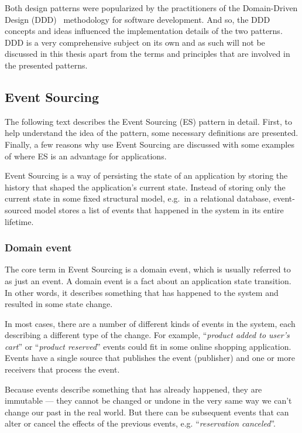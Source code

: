 \documentclass{book}
\begin{document}
Both design patterns were popularized by the practitioners of the
Domain-Driven Design (DDD)~\cite{ddd} methodology for software
development. And so, the DDD concepts and ideas influenced the
implementation details of the two patterns. DDD is a very comprehensive
subject on its own and as such will not be discussed in this thesis
apart from the terms and principles that are involved in the presented
patterns.


\subsection{Event Sourcing}\label{event-sourcing}

The following text describes the Event Sourcing (ES) pattern in detail.
First, to help understand the idea of the pattern, some necessary
definitions are presented. Finally, a few reasons why use Event Sourcing
are discussed with some examples of where ES is an advantage for
applications.

Event Sourcing is a way of persisting the state of an application by
storing the history that shaped the application's current state. Instead
of storing only the current state in some fixed structural model,
e.g.~in a relational database, event-sourced model stores a list of
events that happened in the system in its entire lifetime.~\cite{journey}~\cite{greg-youtube}

\subsubsection{Domain event}\label{domain-event}

The core term in Event Sourcing is a domain event, which is usually
referred to as just an event. A domain event is a fact about an
application state transition. In other words, it describes something
that has happened to the system and resulted in some state change.

In most cases, there are a number of different kinds of events in the
system, each describing a different type of the change. For example,
``\emph{product added to user's cart}'' or ``\emph{product reserved}''
events could fit in some online shopping application. Events have a
single source that publishes the event (publisher) and one or more
receivers that process the event.

Because events describe something that has already happened, they are
immutable --- they cannot be changed or undone in the very same way we
can't change our past in the real world. But there can be subsequent
events that can alter or cancel the effects of the previous events, e.g.
``\emph{reservation canceled}''.
\end{document}
